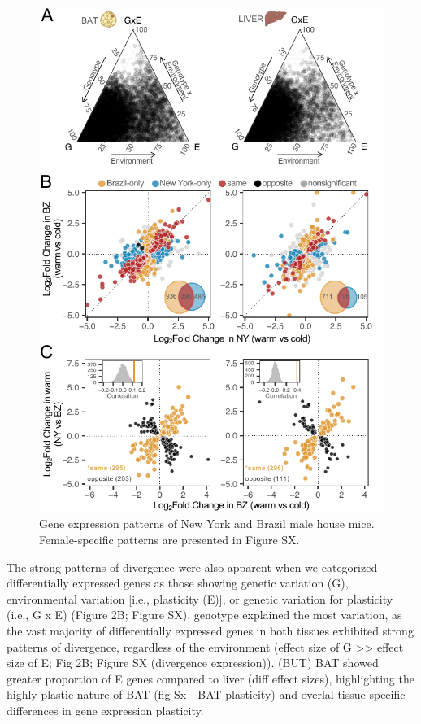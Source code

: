 \documentclass[9pt,twocolumn,twoside,lineno]{pnas-new}
\begin{document}
\begin{figure}[!t]
  \centering
  \includegraphics[width=1\columnwidth]{./figure_2.pdf}
  \caption{Gene expression patterns of New York and Brazil male house mice. Female-specific patterns are presented in Figure SX.}
\end{figure}

The strong patterns of divergence were also apparent when we categorized
differentially expressed genes as those showing genetic variation (G),
environmental variation {[}i.e., plasticity (E){]}, or genetic variation
for plasticity (i.e., G x E) (Figure 2B; Figure SX), genotype explained
the most variation, as the vast majority of differentially expressed
genes in both tissues exhibited strong patterns of divergence,
regardless of the environment (effect size of G
\textgreater\textgreater{} effect size of E; Fig 2B; Figure SX
(divergence expression)). (BUT) BAT showed greater proportion of E genes
compared to liver (diff effect sizes), highlighting the highly plastic
nature of BAT (fig Sx - BAT plasticity) and overlal tissue-specific
differences in gene expression plasticity.
\end{document}
